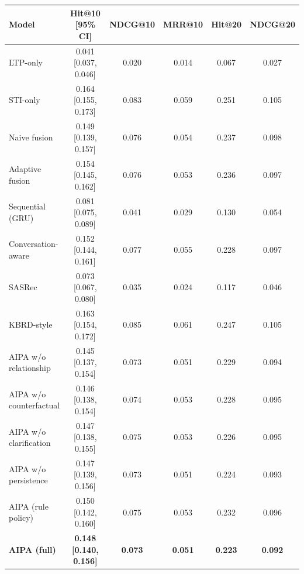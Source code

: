 \begin{tabular}{lccccc}
\toprule
Model & Hit@10 [95\% CI] & NDCG@10 & MRR@10 & Hit@20 & NDCG@20 \\
\midrule
LTP-only & 0.041 [0.037, 0.046] & 0.020 & 0.014 & 0.067 & 0.027 \\
STI-only & 0.164 [0.155, 0.173] & 0.083 & 0.059 & 0.251 & 0.105 \\
Naive fusion & 0.149 [0.139, 0.157] & 0.076 & 0.054 & 0.237 & 0.098 \\
Adaptive fusion & 0.154 [0.145, 0.162] & 0.076 & 0.053 & 0.236 & 0.097 \\
Sequential (GRU) & 0.081 [0.075, 0.089] & 0.041 & 0.029 & 0.130 & 0.054 \\
Conversation-aware & 0.152 [0.144, 0.161] & 0.077 & 0.055 & 0.228 & 0.097 \\
SASRec & 0.073 [0.067, 0.080] & 0.035 & 0.024 & 0.117 & 0.046 \\
KBRD-style & 0.163 [0.154, 0.172] & 0.085 & 0.061 & 0.247 & 0.105 \\
\midrule
AIPA w/o relationship & 0.145 [0.137, 0.154] & 0.073 & 0.051 & 0.229 & 0.094 \\
AIPA w/o counterfactual & 0.146 [0.138, 0.154] & 0.074 & 0.053 & 0.228 & 0.095 \\
AIPA w/o clarification & 0.147 [0.138, 0.155] & 0.075 & 0.053 & 0.226 & 0.095 \\
AIPA w/o persistence & 0.147 [0.139, 0.156] & 0.073 & 0.051 & 0.224 & 0.093 \\
AIPA (rule policy) & 0.150 [0.142, 0.160] & 0.075 & 0.053 & 0.232 & 0.096 \\
\textbf{AIPA (full)} & \textbf{0.148 [0.140, 0.156]} & \textbf{0.073} & \textbf{0.051} & \textbf{0.223} & \textbf{0.092} \\
\bottomrule
\end{tabular}
